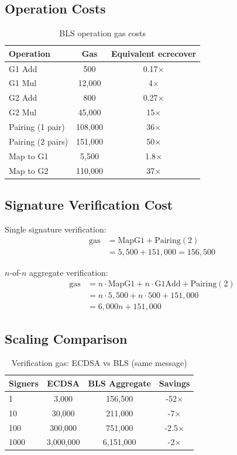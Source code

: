 \documentclass[11pt,a4paper]{article}
\theoremstyle{definition}
\begin{document}
\subsection{Operation Costs}

\begin{table}[h]
\centering
\begin{tabular}{lcc}
\toprule
\textbf{Operation} & \textbf{Gas} & \textbf{Equivalent ecrecover} \\
\midrule
G1 Add & 500 & 0.17$\times$ \\
G1 Mul & 12,000 & 4$\times$ \\
G2 Add & 800 & 0.27$\times$ \\
G2 Mul & 45,000 & 15$\times$ \\
Pairing (1 pair) & 108,000 & 36$\times$ \\
Pairing (2 pairs) & 151,000 & 50$\times$ \\
Map to G1 & 5,500 & 1.8$\times$ \\
Map to G2 & 110,000 & 37$\times$ \\
\bottomrule
\end{tabular}
\caption{BLS operation gas costs}
\label{tab:gas}
\end{table}

\subsection{Signature Verification Cost}

Single signature verification:
\begin{align}
\text{gas} &= \text{MapG1} + \text{Pairing}(2) \\
&= 5,500 + 151,000 = 156,500
\end{align}

$n$-of-$n$ aggregate verification:
\begin{align}
\text{gas} &= n \cdot \text{MapG1} + n \cdot \text{G1Add} + \text{Pairing}(2) \\
&= n \cdot 5,500 + n \cdot 500 + 151,000 \\
&= 6,000n + 151,000
\end{align}

\subsection{Scaling Comparison}

\begin{table}[h]
\centering
\begin{tabular}{lccc}
\toprule
\textbf{Signers} & \textbf{ECDSA} & \textbf{BLS Aggregate} & \textbf{Savings} \\
\midrule
1 & 3,000 & 156,500 & -52$\times$ \\
10 & 30,000 & 211,000 & -7$\times$ \\
100 & 300,000 & 751,000 & -2.5$\times$ \\
1000 & 3,000,000 & 6,151,000 & -2$\times$ \\
\bottomrule
\end{tabular}
\caption{Verification gas: ECDSA vs BLS (same message)}
\label{tab:scaling}
\end{table}
\end{document}
